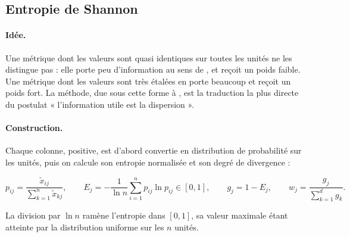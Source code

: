 \documentclass[11pt,a4paper]{article}
\theoremstyle{definition}
\theoremstyle{remark}
\begin{document}
\bigskip

\subsection{Entropie de Shannon}
\label{sec:entropie}

\medskip

\paragraph{Idée.} Une métrique dont les valeurs sont quasi identiques sur toutes les
unités ne les distingue pas : elle porte peu d'information au sens de
\citet{shannon1948}, et reçoit un poids faible. Une métrique dont les valeurs sont très
étalées en porte beaucoup et reçoit un poids fort. La méthode, due sous cette forme à
\citet{zou2006}, est la traduction la plus directe du postulat « l'information utile est
la dispersion ».

\bigskip

\paragraph{Construction.} Chaque colonne, positive, est d'abord convertie en distribution
de probabilité sur les unités, puis on calcule son entropie normalisée et son degré de
divergence :

\medskip

\[
  p_{ij} = \frac{\tilde{x}_{ij}}{\sum_{k=1}^{n}\tilde{x}_{kj}},
  \qquad
  E_j = -\frac{1}{\ln n}\sum_{i=1}^{n} p_{ij}\ln p_{ij} \in [0,1],
  \qquad
  g_j = 1 - E_j,
  \qquad
  w_j = \frac{g_j}{\sum_{k=1}^{d} g_k}.
\]

\bigskip

La division par $\ln n$ ramène l'entropie dans $[0,1]$, sa valeur maximale étant atteinte
par la distribution uniforme sur les $n$ unités.

\medskip
\end{document}

